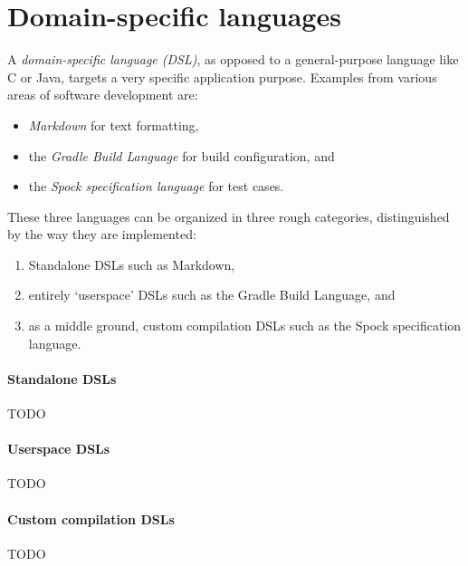 \section{Domain-specific languages}
A \textit{domain-specific language (DSL)},
as opposed to a general-purpose language like C or Java,
targets a very specific application purpose.
Examples from various areas of software development are:
\begin{itemize}
  \item \textit{Markdown} for text formatting, \autocite{MarkdownIntro}
  \item the \textit{Gradle Build Language} for build configuration, \autocite{GradleWritingBuildScripts} and
  \item the \textit{Spock specification language} for test cases. \autocite{SpockFrameworkDoc}
\end{itemize}

These three languages can be organized in three rough categories,
distinguished by the way they are implemented:
\begin{enumerate}
  \item Standalone DSLs such as Markdown,
  \item entirely `userspace' DSLs such as the Gradle Build Language, and
  \item as a middle ground, custom compilation DSLs such as the Spock specification language.
\end{enumerate}

\paragraph{Standalone DSLs}
TODO

\paragraph{Userspace DSLs}
TODO

\paragraph{Custom compilation DSLs}
TODO
